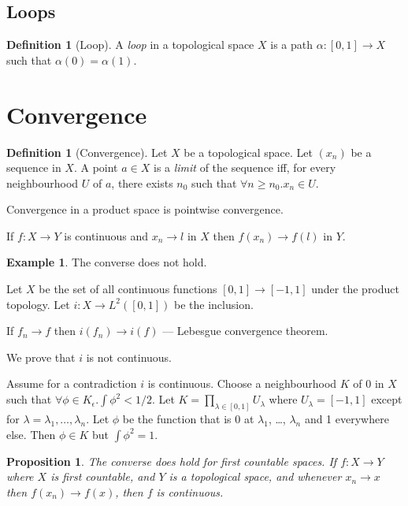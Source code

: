 \documentclass{book}
\newtheorem{prop}[ax]{Proposition}
\theoremstyle{definition}
\newtheorem{df}[ax]{Definition}
\newtheorem{ex}[ax]{Example}
\begin{document}
\subsection{Loops}

\begin{df}[Loop]
A \emph{loop} in a topological space $X$ is a path $\alpha : [0,1] \rightarrow X$ such that $\alpha(0) = \alpha(1)$.
\end{df}

\section{Convergence}

\begin{df}[Convergence]
Let $X$ be a topological space. Let $(x_n)$ be a sequence in $X$. A point $a \in X$ is a \emph{limit} of the sequence iff, for every neighbourhood $U$ of $a$, there exists $n_0$ such that $\forall n \geq n_0. x_n \in U$.
\end{df}

Convergence in a product space is pointwise convergence.

If $f : X \rightarrow Y$ is continuous and $x_n \rightarrow l$ in $X$ then $f(x_n) \rightarrow f(l)$ in $Y$.

\begin{ex}
The converse does not hold.

Let $X$ be the set of all continuous functions $[0,1] \rightarrow [-1,1]$ under the product topology. Let $i : X \rightarrow L^2([0,1])$ be the inclusion.

If $f_n \rightarrow f$ then $i(f_n) \rightarrow i(f)$ --- Lebesgue convergence theorem.

We prove that $i$ is not continuous.

Assume for a contradiction $i$ is continuous. Choose a neighbourhood $K$ of 0 in $X$ such that $\forall \phi \in K _\epsilon. \int \phi^2 < 1/2$. Let $K = \prod_{\lambda \in [0,1]} U_\lambda$ where $U_\lambda = [-1,1]$ except for $\lambda = \lambda_1, \ldots, \lambda_n$. Let $\phi$ be the function that is 0 at $\lambda_1$, \ldots, $\lambda_n$ and 1 everywhere else. Then $\phi \in K$ but $\int \phi^2 = 1$.
\end{ex}

\begin{prop}
The converse does hold for first countable spaces. If $f : X \rightarrow Y$ where $X$ is first countable, and $Y$ is a topological space, and whenever $x_n \rightarrow x$ then $f(x_n) \rightarrow f(x)$, then $f$ is continuous.
\end{prop}
\end{document}
